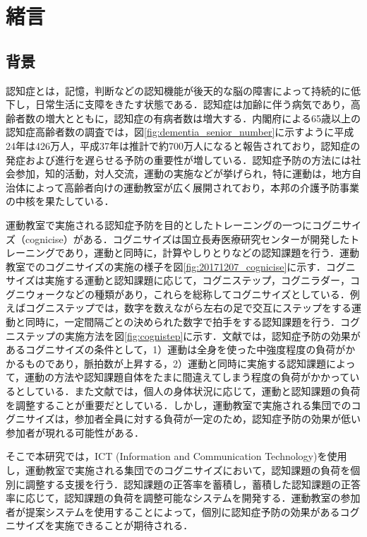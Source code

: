 \chapter{緒言}
\thispagestyle{myheadings}

\section{背景}
認知症とは，記憶，判断などの認知機能が後天的な脳の障害によって持続的に低下し，日常生活に支障をきたす状態である\cite{認知症とは}．認知症は加齢に伴う病気であり，高齢者数の増大とともに，認知症の有病者数は増大する\cite{認知症予防マニュアル}．内閣府による65歳以上の認知症高齢者数の調査\cite{高齢社会白書}では，図\ref{fig:dementia_senior_number}に示すように平成24年は426万人，平成37年は推計で約700万人になると報告されており，認知症の発症および進行を遅らせる予防の重要性が増している\cite{新オレンジプラン}．認知症予防の方法には社会参加，知的活動，対人交流，運動の実施などが挙げられ\cite{運動の効果}，特に運動は，地方自治体によって高齢者向けの運動教室が広く展開されており，本邦の介護予防事業の中核を果たしている\cite{新オレンジプラン}\cite{運動教室}．

運動教室で実施される認知症予防を目的としたトレーニングの一つにコグニサイズ（cognicise）がある\cite{コグニサイズとは}．コグニサイズは国立長寿医療研究センター\cite{国立長寿医療研究センター}が開発したトレーニングであり，運動と同時に，計算やしりとりなどの認知課題を行う．運動教室でのコグニサイズの実施の様子を図\ref{fig:20171207_cognicise}に示す．コグニサイズは実施する運動と認知課題に応じて，コグニステップ，コグニラダー，コグニウォークなどの種類があり，これらを総称してコグニサイズとしている\cite{認知症予防へ向けた運動コグニサイズ}．例えばコグニステップでは，数字を数えながら左右の足で交互にステップをする運動と同時に，一定間隔ごとの決められた数字で拍手をする認知課題を行う．コグニステップの実施方法を図\ref{fig:cognistep}に示す．文献\cite{コグニサイズとは}では，認知症予防の効果があるコグニサイズの条件として，1）運動は全身を使った中強度程度の負荷がかかるものであり，脈拍数が上昇する，2）運動と同時に実施する認知課題によって，運動の方法や認知課題自体をたまに間違えてしまう程度の負荷がかかっているとしている．また文献\cite{認知症予防へ向けた運動コグニサイズ}では，個人の身体状況に応じて，運動と認知課題の負荷を調整することが重要だとしている．しかし，運動教室で実施される集団でのコグニサイズは，参加者全員に対する負荷が一定のため，認知症予防の効果が低い参加者が現れる可能性がある\cite{運動教室の効果}．

そこで本研究では，ICT (Information and Communication Technology)を使用し，運動教室で実施される集団でのコグニサイズにおいて，認知課題の負荷を個別に調整する支援を行う．認知課題の正答率を蓄積し，蓄積した認知課題の正答率に応じて，認知課題の負荷を調整可能なシステムを開発する．運動教室の参加者が提案システムを使用することによって，個別に認知症予防の効果があるコグニサイズを実施できることが期待される．

